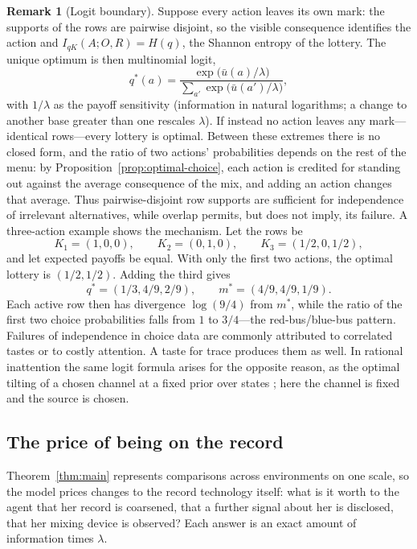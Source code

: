 \documentclass[11pt,a4paper]{article}
\theoremstyle{definition}
\newtheorem{remark}[theorem]{Remark}
\newcommand{\I}{I}
\newcommand{\Sh}{H}
\newcommand{\1}{\mathbf 1}
\begin{document}
\begin{remark}[Logit boundary]\label{rem:logit}
Suppose every action leaves its own mark: the supports of the rows are pairwise disjoint, so the visible
consequence identifies the action and $\I_{qK}(A;O,R)=\Sh(q)$, the Shannon entropy of the lottery.  The unique
optimum is then multinomial logit,
\[
 q^*(a)
 =\frac{\exp\bigl(\bar u(a)/\lambda\bigr)}
 {\sum_{a'}\exp\bigl(\bar u(a')/\lambda\bigr)},
\]
with $1/\lambda$ as the payoff sensitivity (information in natural logarithms; a change to another base greater than one rescales
$\lambda$).  If instead no action leaves any mark---identical rows---every lottery is optimal.  Between these
extremes there is no closed form, and the ratio of two actions' probabilities depends on the rest of the menu:
by Proposition~\ref{prop:optimal-choice}, each action is credited for standing out against the average
consequence of the mix, and adding an action changes that average.  Thus pairwise-disjoint row supports are
sufficient for independence of irrelevant alternatives, while overlap permits, but does not imply, its failure.
A three-action example shows the mechanism.  Let the rows be
\[
 K_1=(1,0,0),\qquad K_2=(0,1,0),\qquad K_3=(1/2,0,1/2),
\]
and let expected payoffs be equal.  With only the first two actions, the optimal lottery is $(1/2,1/2)$.
Adding the third gives
\[
 q^*=(1/3,4/9,2/9),\qquad m^*=(4/9,4/9,1/9).
\]
Each active row then has divergence $\log(9/4)$ from $m^*$, while the ratio of the first two choice
probabilities falls from $1$ to $3/4$---the red-bus/blue-bus pattern.
Failures of independence in choice data are commonly attributed to correlated tastes or to costly attention.  A
taste for trace produces them as well.
In rational inattention the same logit formula arises for the opposite reason, as the optimal tilting of a chosen
channel at a fixed prior over states \cite{MatejkaMcKay2015}; here the channel is fixed and the source is chosen.
\end{remark}

\subsection{The price of being on the record}\label{sec:record-price}

Theorem~\ref{thm:main} represents comparisons across environments on one scale, so the model prices changes to
the record technology itself: what is it worth to the agent that her record is coarsened, that a further signal
about her is disclosed, that her mixing device is observed?  Each answer is an exact amount of information times
$\lambda$.
\end{document}
